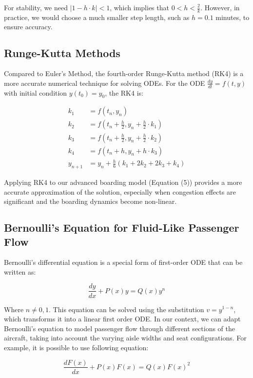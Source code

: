 \documentclass[12pt]{article}
\begin{document}
For stability, we need $|1 - h \cdot k| < 1$, which implies that $0 < h < \frac{2}{k}$. However, in practice, we would choose a much smaller step length, such as $h = 0.1$ minutes, to ensure accuracy.

\subsection{Runge-Kutta Methods}

Compared to Euler's Method, the fourth-order Runge-Kutta method (RK4) is a more accurate numerical technique for solving ODEs. For the ODE $\frac{dy}{dt} = f(t, y)$ with initial condition $y(t_0) = y_0$, the RK4 is:

\begin{align}
k_1 &= f(t_n, y_n) \\
k_2 &= f\left(t_n + \frac{h}{2}, y_n + \frac{h}{2} \cdot k_1\right) \\
k_3 &= f\left(t_n + \frac{h}{2}, y_n + \frac{h}{2} \cdot k_2\right) \\
k_4 &= f(t_n + h, y_n + h \cdot k_3) \\
y_{n+1} &= y_n + \frac{h}{6}(k_1 + 2k_2 + 2k_3 + k_4)
\end{align}

Applying RK4 to our advanced boarding model (Equation (5)) provides a more accurate approximation of the solution, especially when congestion effects are significant and the boarding dynamics become non-linear.

\subsection{Bernoulli's Equation for Fluid-Like Passenger Flow}

Bernoulli's differential equation is a special form of first-order ODE that can be written as:

\begin{equation}
\frac{dy}{dx} + P(x)y = Q(x)y^n
\end{equation}

Where $n \neq 0, 1$. This equation can be solved using the substitution $v = y^{1-n}$, which transforms it into a linear first order ODE. In our context, we can adapt Bernoulli's equation to model passenger flow through different sections of the aircraft, taking into account the varying aisle widths and seat configurations. For example, it is possible to use following equation:

\begin{equation}
\frac{dF(x)}{dx} + P(x)F(x) = Q(x)F(x)^2
\end{equation}
\end{document}
